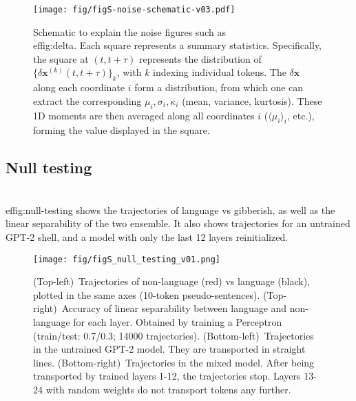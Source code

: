 \documentclass{article} %
\def\vx{{\bm{x}}}
\begin{document}
\begin{figure}[htbp]
\vskip 0.2in
\begin{center}
\centerline{\texttt{[image: fig/figS-noise-schematic-v03.pdf]}}
\caption{
Schematic to explain the noise figures such as \\ef{fig:delta}.
Each square represents a summary statistics.
Specifically, the square at $(t,t+\tau)$ represents the distribution of $\{ \delta \vx^{(k)}(t,t+\tau) \}_k$, with $k$ indexing individual tokens.
The $\delta \vx$ along each coordinate $i$ form a distribution, from which one can extract the corresponding $\mu_i, \sigma_i, \kappa_i$ (mean, variance, kurtosis). 
These 1D moments are then averaged along all coordinates $i$ ($\langle \mu_i \rangle_i$, etc.), forming the value displayed in the square.
}
\label{fig:noise-schematic}
\end{center}
\vskip -0.2in
\end{figure}


\subsection{Null testing}
\label{app:null-testing}
\\ef{fig:null-testing} shows the trajectories of language vs gibberish, as well as the linear separability of the two ensemble.
It also shows trajectories for an untrained GPT-2 shell, and a model with only the last 12 layers reinitialized.

\begin{figure}[htbp]
\vskip 0.2in
\begin{center}
\centerline{\texttt{[image: fig/figS\_null\_testing\_v01.png]}}
\caption{
(Top-left)~Trajectories of non-language (red) vs language (black), plotted in the same axes (10-token pseudo-sentences).
(Top-right)~Accuracy of linear separability between language and non-language for each layer. Obtained by training a Perceptron (train/test: 0.7/0.3; 14000 trajectories).
(Bottom-left)~Trajectories in the untrained GPT-2 model. They are transported in straight lines.
(Bottom-right)~Trajectories in the mixed model. After being transported by trained layers 1-12, the trajectories stop. Layers 13-24 with random weights do not transport tokens any further.
}
\label{fig:null-testing}
\end{center}
\vskip -0.2in
\end{figure}

\end{document}
